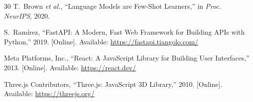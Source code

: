 \documentclass[conference]{IEEEtran}
\begin{document}
\begin{thebibliography}{30}
T.~Brown \textit{et al.}, ``Language Models are Few-Shot Learners,'' in \textit{Proc. NeurIPS}, 2020.

S.~Ram\'{i}rez, ``FastAPI: A Modern, Fast Web Framework for Building APIs with Python,'' 2019. [Online]. Available: \url{https://fastapi.tiangolo.com/}

Meta Platforms, Inc., ``React: A JavaScript Library for Building User Interfaces,'' 2013. [Online]. Available: \url{https://react.dev/}

Three.js Contributors, ``Three.js: JavaScript 3D Library,'' 2010. [Online]. Available: \url{https://threejs.org/}

\end{thebibliography}
\end{document}

